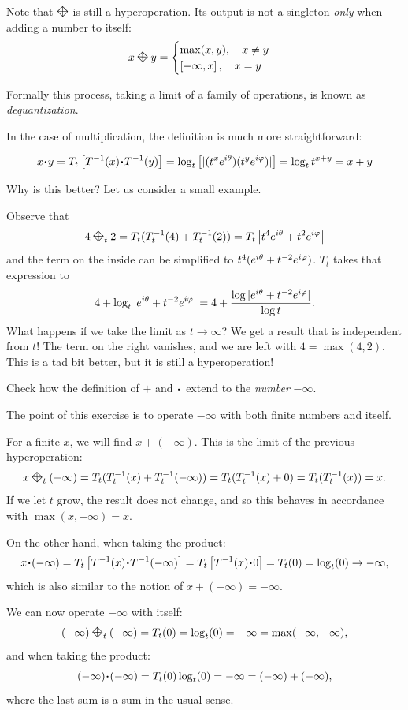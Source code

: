\documentclass[12pt]{memoir}
\newcommand{\diamondplus}{\mathbin{\rotatebox[origin=c]{45}{$\boxtimes$}}} %
\theoremstyle{definition}
\begin{document}
\begin{Rmk}
Note that $\diamondplus$ is still a hyperoperation. Its output is not a singleton \emph{only} when adding a number to itself:
$$x\diamondplus y=\begin{cases}
    \max(x,y),\quad x\neq y\\
    \bonj{-\infty,x},\quad x=y
\end{cases}$$
\end{Rmk}

Formally this process, taking a limit of a family of operations, is known as \emph{dequantization}.\par

In the case of multiplication, the definition is much more straightforward:

$$x\.y =T_t\bonj{T^{-1}(x)\.T^{-1}(y)}=\log_t\bonj{|(t^xe^{i\te})(t^ye^{i\vf})|}=\log_tt^{x+y}=x+y$$


Why is this better? Let us consider a small example. 

\begin{Ex}
    Observe that 
    $$4\diamondplus_t 2=T_t(T_t^{-1}(4)+T_t^{-1}(2))=T_t\left|t^4e^{i\te}+t^2e^{i\vf}\right|$$
    and the term on the inside can be simplified to $t^{4}(e^{i\theta}+t^{-2}e^{i\varphi})$. $T_t$ takes that expression to
    $$4+\log_t|e^{i\theta}+t^{-2}e^{i\varphi}|=4+\frac{\log|e^{i\theta}+t^{-2}e^{i\varphi}|}{\log t}.$$
    What happens if we take the limit as $t\to\infty$? We get a result that is independent from $t$! 
    The term on the right vanishes, and we are left with $4=\max(4,2)$. This is a tad bit better, but it is still a hyperoperation!
\end{Ex}

\begin{Ej}
Check how the definition of $+$ and $\.$ extend to the \emph{number} $-\infty$.
\end{Ej}

\begin{ptcb}
The point of this exercise is to operate $-\infty$ with both finite numbers and itself.\par
For a finite $x$, we will find $x+(-\infty)$. This is the limit of the previous hyperoperation:
$$x\diamondplus_t(-\infty)=T_t(T_t^{-1}(x)+T_t^{-1}(-\infty))=T_t(T_t^{-1}(x)+0)=T_t(T_t^{-1}(x))=x.$$
If we let $t$ grow, the result does not change, and so this behaves in accordance with $\max(x,-\infty)=x$.\par 
On the other hand, when taking the product:
$$x\.(-\infty)=T_t\bonj{T^{-1}(x)\.T^{-1}(-\infty)}=T_t\bonj{T^{-1}(x)\.0}=T_t(0)=\log_t(0)\to-\infty,$$
which is also similar to the notion of $x+(-\infty)=-\infty$.\par 
We can now operate $-\infty$ with itself:
$$(-\infty)\diamondplus_t(-\infty)=T_t(0)=\log_t(0)=-\infty=\max(-\infty,-\infty),$$
and when taking the product:
$$(-\infty)\.(-\infty)=T_t(0)\log_t(0)=-\infty=(-\infty)+(-\infty),$$
where the last sum is a sum in the usual sense.
\end{ptcb}
\end{document}
